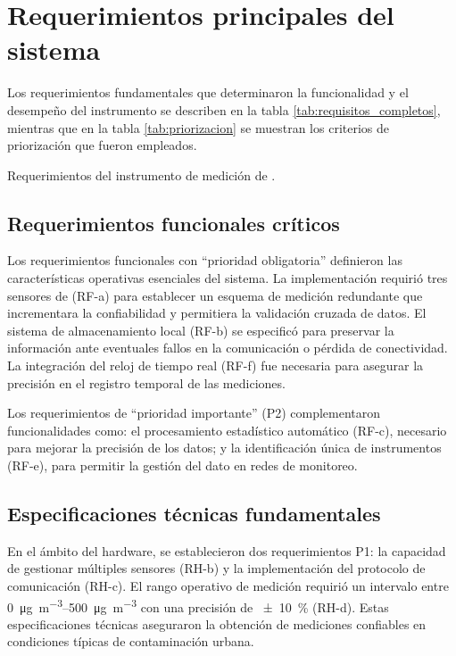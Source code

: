 \section{Requerimientos principales del sistema}

Los requerimientos fundamentales que determinaron la funcionalidad y el desempeño del instrumento se describen en la tabla \ref{tab:requisitos_completos}, mientras que en la tabla \ref{tab:priorizacion} se muestran los criterios de priorización que fueron empleados.

\begin{table}[htbp]
	\centering
	\small
	\caption{Requerimientos del instrumento de medición de \MPF.}
	\label{tab:requisitos_completos}
	
\end{table}

\subsection{Requerimientos funcionales críticos}

Los requerimientos funcionales con ``prioridad obligatoria'' definieron las características operativas esenciales del sistema. La implementación requirió tres sensores de \MPF (RF-a) para establecer un esquema de medición redundante que incrementara la confiabilidad y permitiera la validación cruzada de datos. El sistema de almacenamiento local (RF-b) se especificó para preservar la información ante eventuales fallos en la comunicación o pérdida de conectividad. La integración del reloj de tiempo real (RF-f) fue necesaria para asegurar la precisión en el registro temporal de las mediciones.

Los requerimientos de ``prioridad importante'' (P2) complementaron funcionalidades como: el procesamiento estadístico automático (RF-c), necesario para mejorar la precisión de los datos; y la identificación única de instrumentos (RF-e), para permitir la gestión del dato en redes de monitoreo.

\subsection{Especificaciones técnicas fundamentales}

En el ámbito del hardware, se establecieron dos requerimientos P1: la capacidad de gestionar múltiples sensores (RH-b) y la implementación del protocolo de comunicación (RH-c). El rango operativo de medición requirió un intervalo entre \SIrange{0}{500}{\micro\gram\per\cubic\metre} con una precisión de \SI{\pm10}{\percent} (RH-d). Estas especificaciones técnicas aseguraron la obtención de mediciones confiables en condiciones típicas de contaminación urbana.

